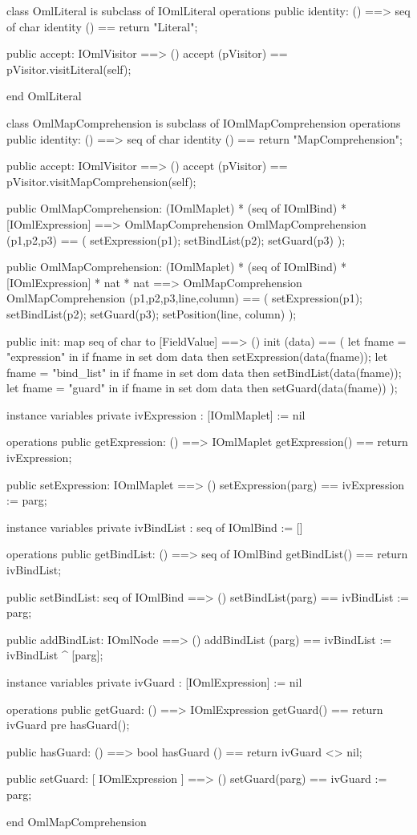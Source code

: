 \begin{vdm_al}
class OmlLiteral is subclass of IOmlLiteral
operations
  public identity: () ==> seq of char
  identity () == return "Literal";

  public accept: IOmlVisitor ==> ()
  accept (pVisitor) == pVisitor.visitLiteral(self);

end OmlLiteral
\end{vdm_al}
\begin{vdm_al}
class OmlMapComprehension is subclass of IOmlMapComprehension
operations
  public identity: () ==> seq of char
  identity () == return "MapComprehension";

  public accept: IOmlVisitor ==> ()
  accept (pVisitor) == pVisitor.visitMapComprehension(self);

  public OmlMapComprehension:
    (IOmlMaplet) *
    (seq of IOmlBind) *
    [IOmlExpression] ==> OmlMapComprehension
  OmlMapComprehension (p1,p2,p3) == 
    ( setExpression(p1);
      setBindList(p2);
      setGuard(p3) );

  public OmlMapComprehension:
    (IOmlMaplet) *
    (seq of IOmlBind) *
    [IOmlExpression] *
    nat *
    nat ==> OmlMapComprehension
  OmlMapComprehension (p1,p2,p3,line,column) == 
    ( setExpression(p1);
      setBindList(p2);
      setGuard(p3);
      setPosition(line, column) );

  public init: map seq of char to [FieldValue] ==> ()
  init (data) ==
    ( let fname = "expression" in
        if fname in set dom data
        then setExpression(data(fname));
      let fname = "bind_list" in
        if fname in set dom data
        then setBindList(data(fname));
      let fname = "guard" in
        if fname in set dom data
        then setGuard(data(fname)) );

instance variables
  private ivExpression : [IOmlMaplet] := nil

operations
  public getExpression: () ==> IOmlMaplet
  getExpression() == return ivExpression;

  public setExpression: IOmlMaplet ==> ()
  setExpression(parg) == ivExpression := parg;

instance variables
  private ivBindList : seq of IOmlBind := []

operations
  public getBindList: () ==> seq of IOmlBind
  getBindList() == return ivBindList;

  public setBindList: seq of IOmlBind ==> ()
  setBindList(parg) == ivBindList := parg;

  public addBindList: IOmlNode ==> ()
  addBindList (parg) == ivBindList := ivBindList ^ [parg];

instance variables
  private ivGuard : [IOmlExpression] := nil

operations
  public getGuard: () ==> IOmlExpression
  getGuard() == return ivGuard
    pre hasGuard();

  public hasGuard: () ==> bool
  hasGuard () == return ivGuard <> nil;

  public setGuard: [ IOmlExpression ] ==> ()
  setGuard(parg) == ivGuard := parg;

end OmlMapComprehension
\end{vdm_al}

